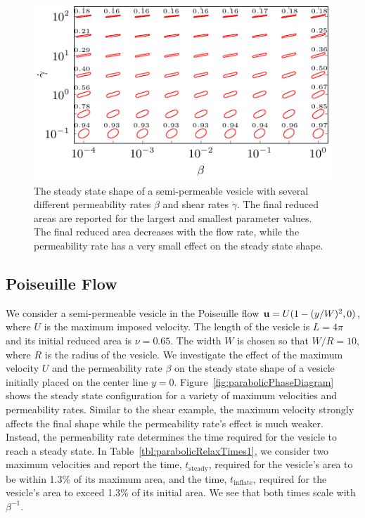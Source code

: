\documentclass[9pt,twocolumn,twoside,lineno]{pnas-new}
\newif\ifTikz
\begin{document}
\begin{figure}[htp]
  \centering
%  
  \includegraphics[width=\linewidth]{figures/shearPhaseDiagramRA2.pdf}
  \caption{\label{fig:shearPhaseDiagram} The steady state shape of a
  semi-permeable vesicle with several different permeability rates
  $\beta$ and shear rates $\dot{\gamma}$. The final reduced areas are
  reported for the largest and smallest parameter values. The final
  reduced area decreases with the flow rate, while the permeability rate
  has a very small effect on the steady state shape.}
\end{figure}

\subsection*{Poiseuille Flow}
We consider a semi-permeable vesicle in the Poiseuille flow $\mathbf{u} =
U(1-(y/W)^2,0)$, where $U$ is the maximum imposed velocity. The length
of the vesicle is $L = 4\pi$ and its initial reduced area is $\nu =
0.65$. The width $W$ is chosen so that $W/R = 10$, where $R$ is the
radius of the vesicle. We investigate the effect of the maximum velocity
$U$ and the permeability rate $\beta$ on the steady state shape of a
vesicle initially placed on the center line $y=0$.
Figure~\ref{fig:parabolicPhaseDiagram} shows the steady state
configuration for a variety of maximum velocities and permeability
rates. Similar to the shear example, the maximum velocity strongly
affects the final shape while the permeability rate's effect is much
weaker. Instead, the permeability rate determines the time required for
the vesicle to reach a steady state. In
Table~\ref{tbl:parabolicRelaxTimes1}, we consider two maximum velocities
and report the time, $t_\mathrm{steady}$, required for the vesicle's
area to be within 1.3\% of its maximum area, and the time,
$t_\mathrm{inflate}$, required for the vesicle's area to exceed 1.3\% of
its initial area. We see that both times scale with $\beta^{-1}$. 
\end{document}
